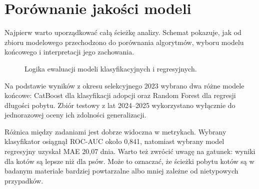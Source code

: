 \section{Porównanie jakości modeli}
\label{sec:porownanie-jakosci-modeli}

Najpierw warto uporządkować całą ścieżkę analizy. Schemat pokazuje, jak od zbioru modelowego przechodzono do porównania algorytmów, wyboru modelu końcowego i interpretacji jego zachowania.

\begin{figure}[htbp]
\centering
{}
\caption{Logika ewaluacji modeli klasyfikacyjnych i regresyjnych.}
\label{fig:logika-ewaluacji-modeli}
\end{figure}

Na podstawie wyników z okresu selekcyjnego 2023 wybrano dwa różne modele końcowe: CatBoost dla klasyfikacji adopcji oraz Random Forest dla regresji długości pobytu. Zbiór testowy z lat 2024--2025 wykorzystano wyłącznie do jednorazowej oceny ich zdolności generalizacji.

Różnica między zadaniami jest dobrze widoczna w metrykach. Wybrany klasyfikator osiągnął ROC-AUC około 0,841, natomiast wybrany model regresyjny uzyskał MAE 20,07 dnia. Warto też zwrócić uwagę na gatunek: wyniki dla kotów są lepsze niż dla psów. Może to oznaczać, że ścieżki pobytu kotów są w badanym materiale bardziej powtarzalne albo mniej zależne od nietypowych przypadków.

